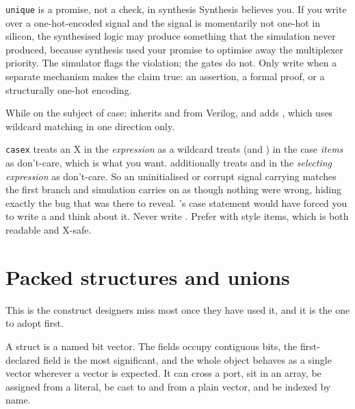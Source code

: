 \begin{gotcha}{\texttt{unique} is a promise, not a check, in synthesis}
Synthesis believes you. If you write  over a
one-hot-encoded signal and the signal is momentarily not one-hot in silicon,
the synthesised logic may produce something that the \RTL{} simulation never
produced, because synthesis used your promise to optimise away the
multiplexer priority. The simulator flags the violation; the gates do not.
Only write  when a separate mechanism makes the claim true: an
assertion, a formal proof, or a structurally one-hot encoding.
\end{gotcha}

While on the subject of case: \SV{} inherits  and 
from Verilog, and adds , which uses wildcard matching in
one direction only.

\begin{gotcha}{\texttt{casex} treats an X in the \emph{expression} as a wildcard}
 treats  (and ) in the case \emph{items} as
don't-care, which is what you want.  additionally treats 
and  in the \emph{selecting expression} as don't-care. So an
uninitialised or corrupt signal carrying  matches the first branch and
simulation carries on as though nothing were wrong, hiding exactly the bug
that  was there to reveal. \VHDL{}'s  case statement
would have forced you to write a  and think about it. Never
write . Prefer  with  style
items, which is both readable and X-safe.
\end{gotcha}

\section{Packed structures and unions}
\label{sec:beyond:struct}

This is the construct \VHDL{} designers miss most once they have used it, and
it is the one to adopt first.

A  struct is a named bit vector. The fields occupy contiguous bits,
the first-declared field is the most significant, and the whole object behaves
as a single vector wherever a vector is expected. It can cross a port, sit in
an array, be assigned from a literal, be cast to and from a plain vector, and
be indexed by name.

